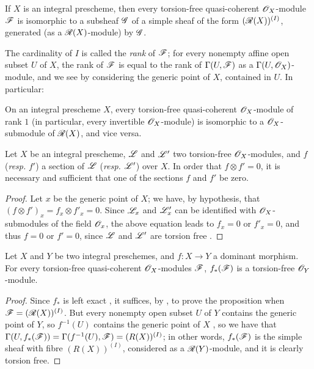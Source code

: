 \begin{prop}[7.4.2]
\label{1.7.4.2}
If $X$ is an integral prescheme, then every torsion-free quasi-coherent $\mathscr{O}_X$-module $\mathscr{F}$ is isomorphic to a subsheaf $\mathscr{G}$ of a simple sheaf of the form $(\mathscr{R}(X))^{(I)}$, generated (as a $\mathscr{R}(X)$-module) by $\mathscr{G}$.
\end{prop}

The cardinality of $I$ is called the \emph{rank} of $\mathscr{F}$; for every nonempty affine open subset $U$ of $X$, the rank of $\mathscr{F}$ is equal to the rank of $\Gamma(U,\mathscr{F})$ as a $\Gamma(U,\mathscr{O}_X)$-module, and we see by considering the generic point of $X$, contained in $U$.
In particular:

\begin{cor}[7.4.3]
\label{1.7.4.3}
On an integral prescheme $X$, every torsion-free quasi-coherent $\mathscr{O}_X$-module of rank $1$ (in particular, every invertible $\mathscr{O}_X$-module) is isomorphic to a $\mathscr{O}_X$-submodule of $\mathscr{R}(X)$, and vice versa.
\end{cor}

\begin{cor}[7.4.4]
\label{1.7.4.4}
Let $X$ be an integral prescheme, $\mathscr{L}$ and $\mathscr{L}'$ two torsion-free $\mathscr{O}_X$-modules, and $f$ (\emph{resp.} $f'$) a section of $\mathscr{L}$ (\emph{resp.} $\mathscr{L}'$) over $X$.
In order that $f\otimes f'=0$, it is necessary and sufficient that one of the sections $f$ and $f'$ be zero.
\end{cor}

\begin{proof}
\label{proof-1.7.4.4}
Let $x$ be the generic point of $X$; we have, by hypothesis, that $(f\otimes f')_x=f_x\otimes f'_x=0$.
Since $\mathscr{L}_x$ and $\mathscr{L}'_x$ can be identified with $\mathscr{O}_X$-submodules of the field $\mathscr{O}_x$, the above equation leads to $f_x=0$ or $f'_x=0$, and thus $f=0$ or $f'=0$, since $\mathscr{L}$ and $\mathscr{L}'$ are torsion free .
\end{proof}

\begin{prop}[7.4.5]
\label{1.7.4.5}
Let $X$ and $Y$ be two integral preschemes, and $f:X\to Y$ a dominant morphism.
For every torsion-free quasi-coherent $\mathscr{O}_X$-modules $\mathscr{F}$, $f_*(\mathscr{F})$ is a torsion-free $\mathscr{O}_Y$-module.
\end{prop}

\begin{proof}
\label{proof-1.7.4.5}
Since
$f_*$ is left exact , it suffices, by , to prove the proposition when $\mathscr{F}=(\mathscr{R}(X))^{(I)}$.
But every nonempty open subset $U$ of $Y$ contains the generic point of $Y$, so $f^{-1}(U)$ contains the generic point of $X$ , so we have that $\Gamma(U,f_*(\mathscr{F}))=\Gamma(f^{-1}(U),\mathscr{F})=(R(X))^{(I)}$; in other words, $f_*(\mathscr{F})$ is the simple sheaf with fibre $(R(X))^{(I)}$, considered as a $\mathscr{R}(Y)$-module, and it is clearly torsion free.
\end{proof}

